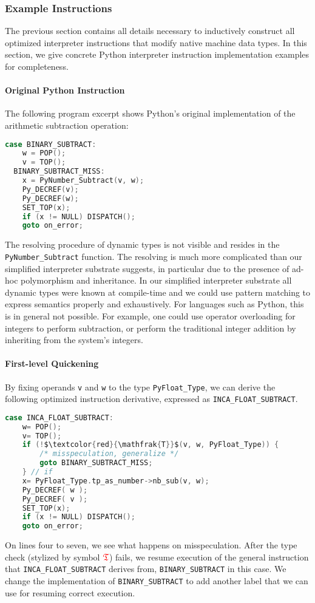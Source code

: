 \documentclass[preprint,10pt]{popl14conf}
\newcommand{\pyType}[1]{\texttt{Py#1\_Type}}
\begin{document}
\subsubsection{Example Instructions}\label{ss:examples}

The previous section contains all details necessary to inductively construct all optimized
interpreter instructions that modify native machine data types.
In this section, we give concrete Python interpreter instruction implementation examples for
completeness.

\paragraph{Original Python Instruction}

The following program excerpt shows Python's original implementation of the arithmetic subtraction
operation:
\begin{lstlisting}[language=C,style=othercode]
case BINARY_SUBTRACT:
    w = POP();
    v = TOP();
  BINARY_SUBTRACT_MISS:
    x = PyNumber_Subtract(v, w);
    Py_DECREF(v);
    Py_DECREF(w);
    SET_TOP(x);
    if (x != NULL) DISPATCH();
    goto on_error;
\end{lstlisting}
The resolving procedure of dynamic types is not visible and resides in the
\texttt{PyNumber_Subtract} function.
The resolving is much more complicated than our simplified interpreter substrate suggests, in
particular due to the presence of ad-hoc polymorphism and inheritance.
In our simplified interpreter substrate all dynamic types were known at compile-time and we could
use pattern matching to express semantics properly and exhaustively.
For languages such as Python, this is in general not possible.
For example, one could use operator overloading for integers to perform subtraction, or perform the
traditional integer addition by inheriting from the system's integers.

\paragraph{First-level Quickening}

By fixing operands \texttt{v} and \texttt{w} to the type \pyType{Float}, we can derive the following
optimized instruction derivative, expressed as \texttt{INCA_FLOAT_SUBTRACT}.
\begin{lstlisting}[language=C,mathescape=true,style=othercode]
case INCA_FLOAT_SUBTRACT:
    w= POP();
    v= TOP();
    if (!$\textcolor{red}{\mathfrak{T}}$(v, w, PyFloat_Type)) {
        /* misspeculation, generalize */
        goto BINARY_SUBTRACT_MISS;
    } // if
    x= PyFloat_Type.tp_as_number->nb_sub(v, w);
    Py_DECREF( w );
    Py_DECREF( v );
    SET_TOP(x);
    if (x != NULL) DISPATCH();
    goto on_error;
\end{lstlisting}
On lines four to seven, we see what happens on misspeculation.
After the type check (stylized by symbol $\textcolor{red}{\mathfrak{T}}$) fails, we resume execution
of the general instruction that \texttt{INCA_FLOAT_SUBTRACT} derives from, \texttt{BINARY_SUBTRACT}
in this case.
We change the implementation of \texttt{BINARY_SUBTRACT} to add another label that we can use for
resuming correct execution.
\end{document}
